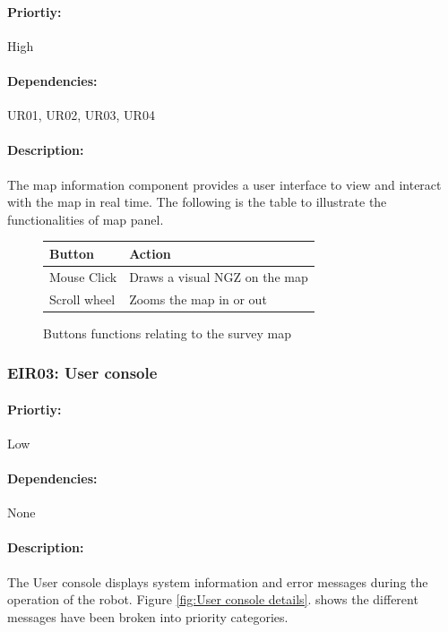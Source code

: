 \documentclass[10pt,a4paper,titlepage]{article}
\begin{document}
	\paragraph{Priortiy:} High
	\paragraph{Dependencies:} UR01, UR02, UR03, UR04
	\paragraph{Description:} The map information component provides a user interface to view and interact with the map in real time. The following is the table to illustrate the functionalities of map panel.
	
	\begin{figure}[H]
		\centering
		\begin{tabular}{|p{3cm}|p{6cm}|}
			\hline 
			\textbf{Button} &\textbf{Action} \\ \hline 
			Mouse Click & Draws a visual NGZ on the map\\ \hline 
			Scroll wheel & Zooms the map in or out\\ \hline 
		\end{tabular} 
		\caption{Buttons functions relating to the survey map}
		\label{fig:button functions map}
	\end{figure}
	
	\subsubsection*{EIR03: User console}
	\paragraph{Priortiy:} Low
	\paragraph{Dependencies:} None
	\paragraph{Description:} The User console displays system information and error messages during the operation of the robot. Figure \ref{fig:User console details}. shows the different messages have been broken into priority categories.
	
\end{document}
